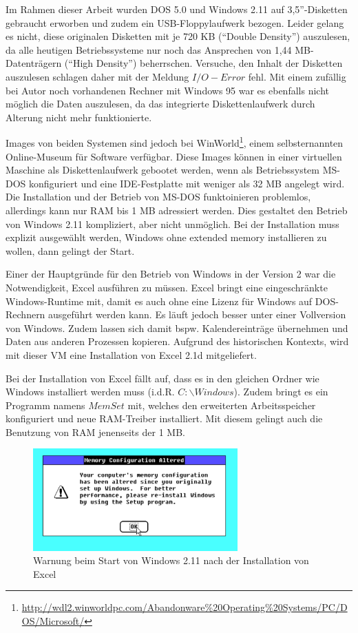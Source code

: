 	Im Rahmen dieser Arbeit wurden DOS 5.0 und Windows 2.11 auf 3,5''-Disketten gebraucht erworben und zudem ein USB-Floppylaufwerk bezogen.
	Leider gelang es nicht, diese originalen Disketten mit je 720 KB ("`Double Density"') auszulesen, da alle heutigen Betriebssysteme nur noch das Ansprechen von 1,44 MB-Datenträgern ("`High Density"') beherrschen.
	Versuche, den Inhalt der Disketten auszulesen schlagen daher mit der Meldung $I/O-Error$ fehl.
	Mit einem zufällig bei Autor noch vorhandenen Rechner mit Windows 95 war es ebenfalls nicht möglich die Daten auszulesen, da das integrierte Diskettenlaufwerk durch Alterung nicht mehr funktionierte.

	Images von beiden Systemen sind jedoch bei WinWorld\footnote{\url{http://wdl2.winworldpc.com/Abandonware\%20Operating\%20Systems/PC/DOS/Microsoft/}}, einem selbsternannten Online-Museum für Software verfügbar.
	Diese Images können in einer virtuellen Maschine als Diskettenlaufwerk gebootet werden, wenn als Betriebssystem MS-DOS konfiguriert und eine IDE-Festplatte mit weniger als 32 MB angelegt wird.
	Die Installation und der Betrieb von MS-DOS funktoinieren problemlos, allerdings kann nur RAM bis 1 MB adressiert werden.
	Dies gestaltet den Betrieb von Windows 2.11 kompliziert, aber nicht unmöglich.
	Bei der Installation muss explizit ausgewählt werden, Windows ohne extended memory installieren zu wollen, dann gelingt der Start.

	Einer der Hauptgründe für den Betrieb von Windows in der Version 2 war die Notwendigkeit, Excel ausführen zu müssen.
	Excel bringt eine eingeschränkte Windows-Runtime mit, damit es auch ohne eine Lizenz für Windows auf DOS-Rechnern ausgeführt werden kann.
	Es läuft jedoch besser unter einer Vollversion von Windows. 
	Zudem lassen sich damit bspw. Kalendereinträge übernehmen und Daten aus anderen Prozessen  kopieren.
	Aufgrund des historischen Kontexts, wird mit dieser VM eine Installation von Excel 2.1d mitgeliefert.

	Bei der Installation von Excel fällt auf, dass es in den gleichen Ordner wie Windows installiert werden muss (i.d.R. $C:\backslash{}Windows$). Zudem bringt es ein Programm namens $MemSet$ mit, welches den erweiterten Arbeitsspeicher konfiguriert und neue RAM-Treiber installiert. Mit diesem gelingt auch die Benutzung von RAM jenenseits der 1 MB.



	\begin{figure}[h]
		\begin{center}
			\includegraphics[width=0.7\textwidth]{img/WIN211_1}
			\caption{Warnung beim Start von Windows 2.11 nach der Installation von Excel}
			\label{fig:screenshot-win211error}
		\end{center}
	\end{figure}

